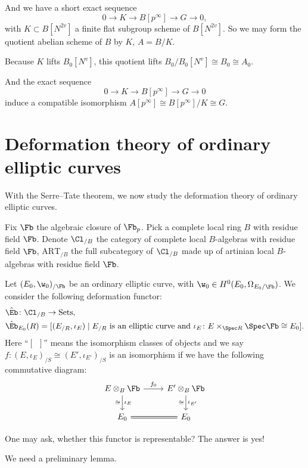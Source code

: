 \documentclass[twoside]{article}
\begin{document}
    And we have a short exact sequence 
    \[   0\to K \to B[p^{\infty}]\to G \to 0, \]
    with $K\subset B[N^{2v}] $ a finite flat subgroup scheme of $B[N^{2v}]$.
    So we may form the  quotient abelian scheme of $B$ by $K$, $A=B/K$.

    Because $K$ lifts $B_{0}[N^{v}]$,
    this quotient lifts $B_{0}/B_{0}[N^{v}]\cong B_{0}\cong A_{0}$.

    And the exact sequence 
    \[   0\to K \to B[p^{\infty}]\to G \to 0 \]
    induce a compatible isomorphism $A[p^{\infty}] \cong B[p^{\infty}]/K \cong G $.
\epf

\section{Deformation theory of ordinary elliptic curves}

With the Serre--Tate theorem,
we now study the deformation theory of  ordinary elliptic curves.

Fix $\Fb$ the algebraic closure of $\Fb_{p}$.
Pick a complete local ring $B$ with residue field $\Fb$.
Denote $\Cl_{/B}$ the category of complete local $B$-algebras with residue field $\Fb$,
$\mathrm{ART}_{/B}$ the full subcategory of $\Cl_{/B}$ made up of artinian local $B$-algebras with residue field $\Fb$.

Let $(E_{0},\w_{0})_{/\Fb}$ be an ordinary elliptic curve,
with $\w_{0}\in H^{0}(E_{0},\Omega_{E_{0}/\Fb})$. We consider the following deformation functor:
\[ \begin{aligned}
    &\hat{\Eb} \colon \Cl_{/B} \to \mathrm{Sets}, \\
    &\hat{\Eb}_{E_{0}}(R) = [(E_{/R},\iota_{E})\mid 
    E_{/R}\text{ is an elliptic curve and }\iota_{E}\colon E\times_{\Spec R}\Spec\Fb \cong E_{0}].
\end{aligned} \]
Here ``$[\enspace]$'' means the isomorphism classes of objects and we say
$f\colon (E,\iota_{E})_{/S}\cong (E',\iota_{E'})_{/S}$ is an isomorphism if we have the following commutative diagram:
\[ \begin{tikzcd}
    E\otimes_{B}\Fb \ar[r, "f_{0}"]\ar[d, "\iota_{E}", "\cong"']&E'\otimes_{B}\Fb \ar[d, "\iota_{E'}", "\cong"'] \\
    E_{0}\ar[r,equal]&E_{0}
\end{tikzcd} \]

One may ask, whether this functor is representable? The answer is yes!

We need a preliminary lemma.
\end{document}
